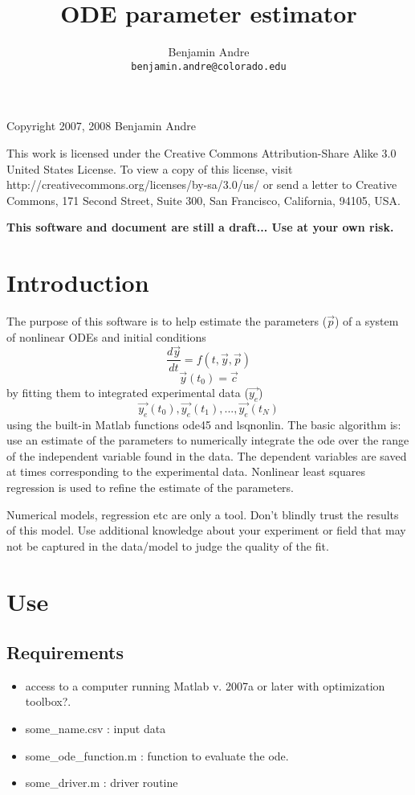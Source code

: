 \documentclass[10pt]{article}
\author{Benjamin Andre\\
  \makeatletter \texttt{benjamin.andre@colorado.edu} }
\title{\textbf{ODE parameter estimator}}
\date{
  {\small \cvsstamp}}
\theoremstyle{plain}
\begin{document}
\maketitle
\pagestyle{myheadings}

\begin{center}
Copyright 2007, 2008 Benjamin Andre

This work is licensed under the Creative Commons Attribution-Share
Alike 3.0 United States License. To view a copy of this license, visit
http://creativecommons.org/licenses/by-sa/3.0/us/ or send a letter to
Creative Commons, 171 Second Street, Suite 300, San Francisco,
California, 94105, USA.
\end{center}

\textbf{This software and document are still a draft...  Use at your own risk.}

\section{Introduction}
The purpose of this software is to help estimate the parameters
($\vec{p}$) of a system of nonlinear ODEs and initial conditions
\begin{equation}
\frac{d\vec{y}}{dt} = f(t, \vec{y}, \vec{p})
\end{equation}
\begin{equation}
\vec{y}(t_0)=\vec{c} 
\end{equation}
by fitting them to integrated experimental data ($\vec{y_e}$)
\begin{equation}
\vec{y_e}(t_0), \vec{y_e}(t_1), ... , \vec{y_e}(t_N)
\end{equation}
using the built-in Matlab functions ode45 and lsqnonlin. The basic
algorithm is: use an estimate of the parameters to numerically
integrate the ode over the range of the independent variable found in
the data. The dependent variables are saved at times corresponding to
the experimental data. Nonlinear least squares regression is used to
refine the estimate of the parameters.

Numerical models, regression etc are only a tool. Don't blindly trust
the results of this model. Use additional knowledge about your
experiment or field that may not be captured in the data/model to
judge the quality of the fit.

\section{Use}
\subsection{Requirements}
\begin{itemize}
\item access to a computer running Matlab v. 2007a or later with optimization toolbox?.
\item some\_name.csv : input data
\item some\_ode\_function.m : function to evaluate the ode.
\item some\_driver.m : driver routine
\end{itemize}
\end{document}
